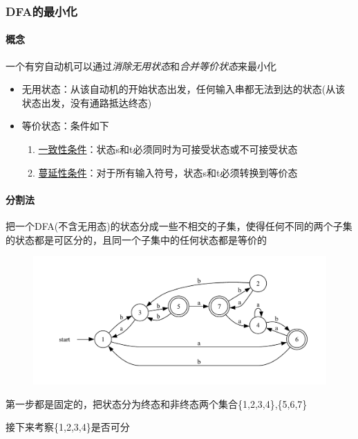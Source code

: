 \documentclass[UTF8]{ctexart} %
\begin{document}
\subsubsection{DFA的最小化}

\paragraph{概念} 一个有穷自动机可以通过\emph{消除无用状态}和\emph{合并等价状态}来最小化

\begin{itemize}
    \item 无用状态：从该自动机的开始状态出发，任何输入串都无法到达的状态(从该状态出发，没有通路抵达终态)
    \item 等价状态：条件如下
          \begin{enumerate}
              \item \underline{一致性条件}：状态s和t必须同时为可接受状态或不可接受状态
              \item \underline{蔓延性条件}：对于所有输入符号，状态s和t必须转换到等价态
          \end{enumerate}
\end{itemize}

\paragraph{分割法} 把一个DFA(不含无用态)的状态分成一些不相交的子集，使得任何不同的两个子集的状态都是可区分的，且同一个子集中的任何状态都是等价的

\begin{figure}[H]
    \centering
    \includegraphics[width=\textwidth]{assets/dfa5.pdf}
\end{figure}

第一步都是固定的，把状态分为终态和非终态两个集合\{1,2,3,4\},\{5,6,7\}

接下来考察\{1,2,3,4\}是否可分
\end{document}
